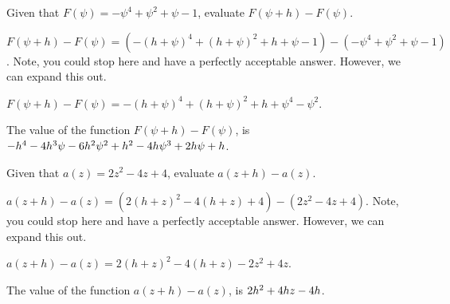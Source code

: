 \begin{shuffle}
\begin{exercise}
Given that $F(\psi)=-\psi ^4+\psi ^2+\psi -1$, evaluate $F(\psi+h)-F(\psi)$.
\begin{solution}
\begin{hint}
$F(\psi+h)-F(\psi)=(-(h+\psi )^4+(h+\psi )^2+h+\psi -1)-(-\psi ^4+\psi ^2+\psi -1)$. Note, you could stop here and have a perfectly acceptable answer. However, we can expand this out.
\end{hint}
\begin{hint}
$F(\psi+h)-F(\psi)=-(h+\psi )^4+(h+\psi )^2+h+\psi ^4-\psi ^2$.
\end{hint}
The value of the function $F(\psi+h)-F(\psi)$, is ${-h^4-4 h^3 \psi -6 h^2 \psi ^2+h^2-4 h \psi ^3+2 h \psi +h}$.
\end{solution}
\end{exercise}

\begin{exercise}
Given that $a(z)=2 z^2-4 z+4$, evaluate $a(z+h)-a(z)$.
\begin{solution}
\begin{hint}
$a(z+h)-a(z)=(2 (h+z)^2-4 (h+z)+4)-(2 z^2-4 z+4)$. Note, you could stop here and have a perfectly acceptable answer. However, we can expand this out.
\end{hint}
\begin{hint}
$a(z+h)-a(z)=2 (h+z)^2-4 (h+z)-2 z^2+4 z$.
\end{hint}
The value of the function $a(z+h)-a(z)$, is ${2 h^2+4 h z-4 h}$.
\end{solution}
\end{exercise}
\end{shuffle}



